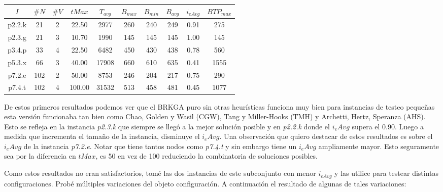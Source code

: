 \begin{center}
\begin{tabular}{ |c|c|c|c|c|c|c|c|c|c| } 
 \hline
$I$ & $\#N$ & $\#V$ & $tMax$ & $T_{avg}$ & $B_{max}$ & $B_{min}$ & $B_{avg}$ & $i_{eAvg}$ & $BTP_{max}$ \\
\hline
p2.2.k & 21 & 2 & 22.50 & 2977 & 260 & 240 & 249 & 0.91 & 275  \\
p2.3.g & 21 & 3 & 10.70 & 1990 & 145 & 145 & 145 & 1.00 & 145  \\
p3.4.p & 33 & 4 & 22.50 & 6482 & 450 & 430 & 438 & 0.78 & 560  \\
p5.3.x & 66 & 3 & 40.00 & 17908 & 660 & 610 & 635 & 0.41 & 1555  \\
p7.2.e & 102 & 2 & 50.00 & 8753 & 246 & 204 & 217 & 0.75 & 290  \\
p7.4.t & 102 & 4 & 100.00 & 31532 & 513 & 458 & 481 & 0.45 & 1077  \\
\hline
\end{tabular}
\end{center}

\bigskip

De estos primeros resultados podemos ver que el BRKGA puro sin otras heurísticas funciona muy bien para instancias de testeo pequeñas esta versión funcionaba tan bien como Chao, Golden y Wasil \cite{ChaoGoldenWasil} (CGW), Tang y Miller-Hooks \cite{TangMillerHooks} (TMH) y Archetti, Hertz, Speranza \cite{ArchettiHertzSperanza} (AHS). Esto se refleja en la instancia \textit{p2.3.k} que siempre se llegó a la mejor solución posible y en \textit{p2.2.k} donde el $i_eAvg$ supera el 0.90. Luego a medida que incrementa el tamaño de la instancia, disminuye el $i_eAvg$. Una observación que quiero destacar de estos resultados es sobre el $i_eAvg$ de la instancia \textit{p7.2.e}. Notar que tiene tantos nodos como \textit{p7.4.t} y sin embargo tiene un $i_eAvg$ ampliamente mayor. Esto seguramente sea por la diferencia en $tMax$, es 50 en vez de 100 reduciendo la combinatoria de soluciones posibles.


\bigskip

Como estos resultados no eran satisfactorios, tomé las dos instancias de este subconjunto con menor $i_{eAvg}$ y las utilice para testear distintas configuraciones. Probé múltiples variaciones del objeto configuración. A continuación el resultado de algunas de tales variaciones:

\bigskip


